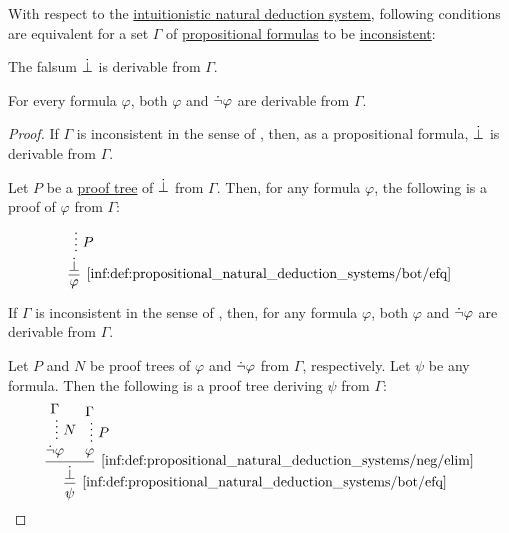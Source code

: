 \begin{proposition}\label{thm:propositional_consistent_set}
  With respect to the \hyperref[def:propositional_natural_deduction_systems]{intuitionistic natural deduction system}, following conditions are equivalent for a set \( \Gamma \) of \hyperref[def:propositional_syntax/formula]{propositional formulas} to be \hyperref[def:consistent_set_of_sentences]{inconsistent}:
  \begin{thmenum}
     The falsum \( \dot{\bot} \) is derivable from \( \Gamma \).

     For every formula \( \varphi \), both \( \varphi \) and \( \dot{\neg} \varphi \) are derivable from \( \Gamma \).
  \end{thmenum}
\end{proposition}
\begin{proof}

  \SufficiencySubProof* If \( \Gamma \) is inconsistent in the sense of , then, as a propositional formula, \( \dot{\bot} \) is derivable from \( \Gamma \).

  \NecessitySubProof* Let \( P \) be a \hyperref[def:natural_deduction_proof_tree]{proof tree} of \( \dot{\bot} \) from \( \Gamma \). Then, for any formula \( \varphi \), the following is a proof of \( \varphi \) from \( \Gamma \):
  \begin{equation*}
    \begin{prooftree}
      \hypo{}
      \ellipsis { \( P \) } { \synbot }
      \infer1[\ref{inf:def:propositional_natural_deduction_systems/bot/efq}]{ \varphi }.
    \end{prooftree}
  \end{equation*}


  \SufficiencySubProof* If \( \Gamma \) is inconsistent in the sense of , then, for any formula \( \varphi \), both \( \varphi \) and \( \dot{\neg} \varphi \) are derivable from \( \Gamma \).

  \NecessitySubProof* Let \( P \) and \( N \) be proof trees of \( \varphi \) and \( \dot{\neg} \varphi \) from \( \Gamma \), respectively. Let \( \psi \) be any formula. Then the following is a proof tree deriving \( \psi \) from \( \Gamma \):
  \begin{equation*}
    \begin{prooftree}
      \hypo{ \Gamma }
      \ellipsis { \( N \) } { \synneg \varphi }

      \hypo{ \Gamma }
      \ellipsis { \( P \) } { \varphi }

      \infer2[\ref{inf:def:propositional_natural_deduction_systems/neg/elim}]{ \synbot }.

      \infer1[\ref{inf:def:propositional_natural_deduction_systems/bot/efq}]{ \psi }.
    \end{prooftree}
  \end{equation*}
\end{proof}

